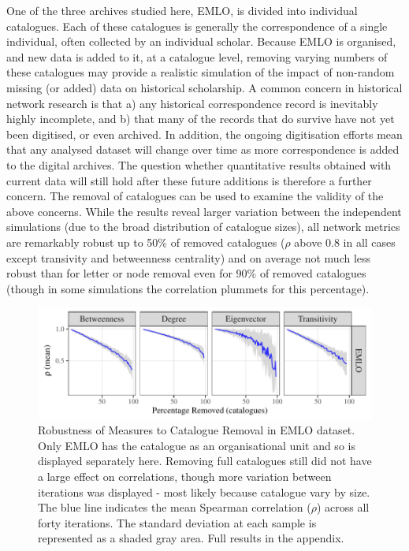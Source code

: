 \documentclass[]{article}
\begin{document}
One of the three archives studied here, EMLO, is divided into individual catalogues. Each of these catalogues is generally the correspondence of a single individual, often collected by an individual scholar. Because EMLO is organised, and new data is added to it, at a catalogue level, removing varying numbers of these catalogues may provide a realistic simulation of the impact of non-random missing (or added) data on historical scholarship. A common concern in historical network research is that a) any historical correspondence record is inevitably highly incomplete, and b) that many of the records that do survive have not yet been digitised, or even archived. In addition, the ongoing digitisation efforts mean that any analysed dataset will change over time as more correspondence is added to the digital archives. The question whether quantitative results obtained with current data will still hold after these future additions is therefore a further concern. The removal of catalogues can be used to examine the validity of the above concerns. While the results reveal larger variation between the independent simulations (due to the broad distribution of catalogue sizes), all network metrics are remarkably robust up to 50\% of removed catalogues (\(\rho\) above 0.8 in all cases except transivity and betweenness centrality) and on average not much less robust than for letter or node removal even for 90\% of removed catalogues (though in some simulations the correlation plummets for this percentage).

\begin{figure}

{\centering \includegraphics{network_robustness_article_anon_files/figure-latex/unnamed-chunk-13-1} 

}

\caption{Robustness of Measures to Catalogue Removal in EMLO dataset. Only EMLO has the catalogue as an organisational unit and so is displayed separately here. Removing full catalogues still did not have a large effect on correlations, though more variation between iterations was displayed - most likely because catalogue vary by size.  The blue line indicates the mean Spearman correlation ($\rho$) across all forty iterations. The standard deviation at each sample is represented as a shaded gray area. Full results in the appendix.}\label{fig:unnamed-chunk-13}
\end{figure}
\end{document}
